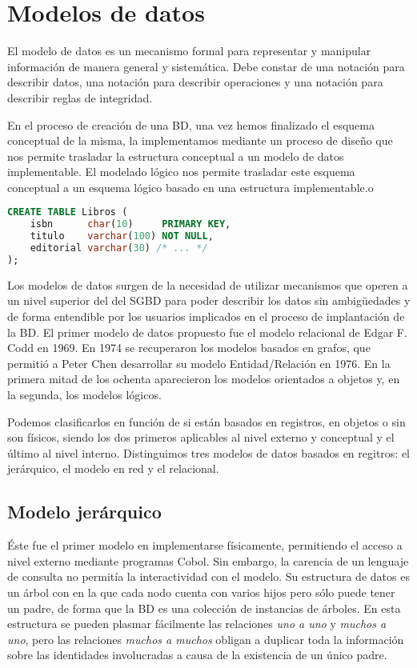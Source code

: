 \chapter{Modelos de datos}

\begin{displayquote}
El modelo de datos es un mecanismo formal para representar y manipular información de manera general y sistemática.
Debe constar de una notación para describir datos, una notación para describir operaciones y una notación para describir reglas de integridad.
\end{displayquote}

En el proceso de creación de una BD, una vez hemos finalizado el esquema conceptual de la misma, la implementamos mediante un proceso de diseño que nos permite trasladar la estructura conceptual a un modelo de datos implementable.
El modelado lógico nos permite trasladar este esquema conceptual a un esquema lógico basado en una estructura implementable.o

\begin{lstlisting}[language=SQL]
CREATE TABLE Libros (
	isbn      char(10)     PRIMARY KEY,
	titulo    varchar(100) NOT NULL,
	editorial varchar(30) /* ... */
);
\end{lstlisting}

Los modelos de datos surgen de la necesidad de utilizar mecanismos que operen a un nivel superior del del SGBD para poder describir los datos sin ambigüedades y de forma entendible por los usuarios implicados en el proceso de implantación de la BD\@.
El primer modelo de datos propuesto fue el modelo relacional de Edgar F. Codd en 1969.
En 1974 se recuperaron los modelos basados en grafos, que permitió a Peter Chen desarrollar su modelo Entidad/Relación en 1976.
En la primera mitad de los ochenta aparecieron los modelos orientados a objetos y, en la segunda, los modelos lógicos.

Podemos clasificarlos en función de si están basados en registros, en objetos o sin son físicos, siendo los dos primeros aplicables al nivel externo y conceptual y el último al nivel interno.
Distinguimos tres modelos de datos basados en regitros: el jerárquico, el modelo en red y el relacional.

\section{Modelo jerárquico}

Éste fue el primer modelo en implementarse físicamente, permitiendo el acceso a nivel externo mediante programas Cobol.
Sin embargo, la carencia de un lenguaje de consulta no permitía la interactividad con el modelo.
Su estructura de datos es un árbol con en la que cada nodo cuenta con varios hijos pero sólo puede tener un padre, de forma que la BD es una colección de instancias de árboles.
En esta estructura se pueden plasmar fácilmente las relaciones \textit{uno a uno} y \textit{muchos a uno}, pero las relaciones \textit{muchos a muchos} obligan a duplicar toda la información sobre las identidades involucradas a causa de la existencia de un único padre.

